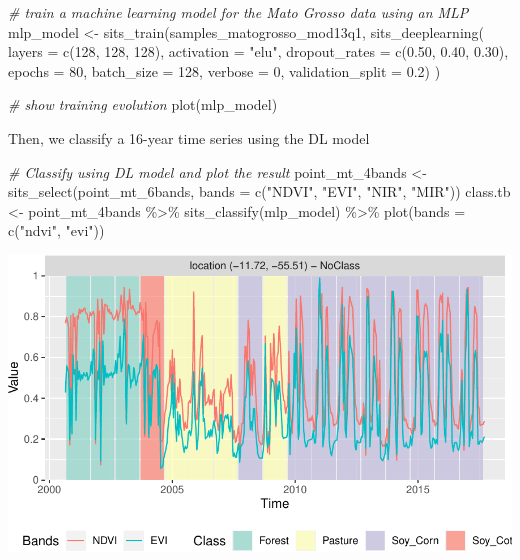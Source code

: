 \documentclass[a4paper,]{tufte-book}
\newenvironment{Shaded}{}{}
\newcommand{\AttributeTok}[1]{\textcolor[rgb]{0.49,0.56,0.16}{#1}}
\newcommand{\CommentTok}[1]{\textcolor[rgb]{0.38,0.63,0.69}{\textit{#1}}}
\newcommand{\DecValTok}[1]{\textcolor[rgb]{0.25,0.63,0.44}{#1}}
\newcommand{\FloatTok}[1]{\textcolor[rgb]{0.25,0.63,0.44}{#1}}
\newcommand{\FunctionTok}[1]{\textcolor[rgb]{0.02,0.16,0.49}{#1}}
\newcommand{\NormalTok}[1]{#1}
\newcommand{\OtherTok}[1]{\textcolor[rgb]{0.00,0.44,0.13}{#1}}
\newcommand{\SpecialCharTok}[1]{\textcolor[rgb]{0.25,0.44,0.63}{#1}}
\newcommand{\StringTok}[1]{\textcolor[rgb]{0.25,0.44,0.63}{#1}}
\begin{document}
\begin{Shaded}
\begin{Highlighting}[]
\CommentTok{\# train a machine learning model for the Mato Grosso data using an MLP}
\NormalTok{mlp\_model }\OtherTok{\textless{}{-}} \FunctionTok{sits\_train}\NormalTok{(samples\_matogrosso\_mod13q1, }
                        \FunctionTok{sits\_deeplearning}\NormalTok{(}
                        \AttributeTok{layers           =} \FunctionTok{c}\NormalTok{(}\DecValTok{128}\NormalTok{, }\DecValTok{128}\NormalTok{, }\DecValTok{128}\NormalTok{),}
                        \AttributeTok{activation       =} \StringTok{"elu"}\NormalTok{,}
                        \AttributeTok{dropout\_rates    =} \FunctionTok{c}\NormalTok{(}\FloatTok{0.50}\NormalTok{, }\FloatTok{0.40}\NormalTok{, }\FloatTok{0.30}\NormalTok{),}
                        \AttributeTok{epochs           =} \DecValTok{80}\NormalTok{,}
                        \AttributeTok{batch\_size       =} \DecValTok{128}\NormalTok{,}
                        \AttributeTok{verbose          =} \DecValTok{0}\NormalTok{,}
                        \AttributeTok{validation\_split =} \FloatTok{0.2}\NormalTok{) )}

\CommentTok{\# show training evolution}
\FunctionTok{plot}\NormalTok{(mlp\_model)}
\end{Highlighting}
\end{Shaded}

Then, we classify a 16-year time series using the DL model

\begin{Shaded}
\begin{Highlighting}[]
\CommentTok{\# Classify using DL model and plot the result}
\NormalTok{point\_mt\_4bands }\OtherTok{\textless{}{-}} \FunctionTok{sits\_select}\NormalTok{(point\_mt\_6bands, }
                               \AttributeTok{bands =} \FunctionTok{c}\NormalTok{(}\StringTok{"NDVI"}\NormalTok{, }\StringTok{"EVI"}\NormalTok{, }\StringTok{"NIR"}\NormalTok{, }\StringTok{"MIR"}\NormalTok{))}
\NormalTok{class.tb }\OtherTok{\textless{}{-}}\NormalTok{ point\_mt\_4bands }\SpecialCharTok{\%\textgreater{}\%} 
    \FunctionTok{sits\_classify}\NormalTok{(mlp\_model) }\SpecialCharTok{\%\textgreater{}\%} 
    \FunctionTok{plot}\NormalTok{(}\AttributeTok{bands =} \FunctionTok{c}\NormalTok{(}\StringTok{"ndvi"}\NormalTok{, }\StringTok{"evi"}\NormalTok{))}
\end{Highlighting}
\end{Shaded}

\begin{center}\includegraphics[width=0.7\linewidth]{sitsbook_files/figure-latex/unnamed-chunk-51-1} \end{center}
\end{document}
